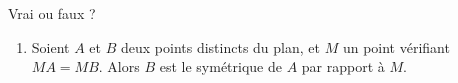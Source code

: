 
\begin{exercice}\label{exosmath-0651}

    Vrai ou faux ?
    \begin{enumerate}
        \item
            
    Soient \( A\) et \( B\) deux points distincts du plan, et \( M\) un point vérifiant \( MA=MB\). Alors \( B\) est le symétrique de \( A\) par rapport à \( M\).

    \end{enumerate}
\end{exercice}
